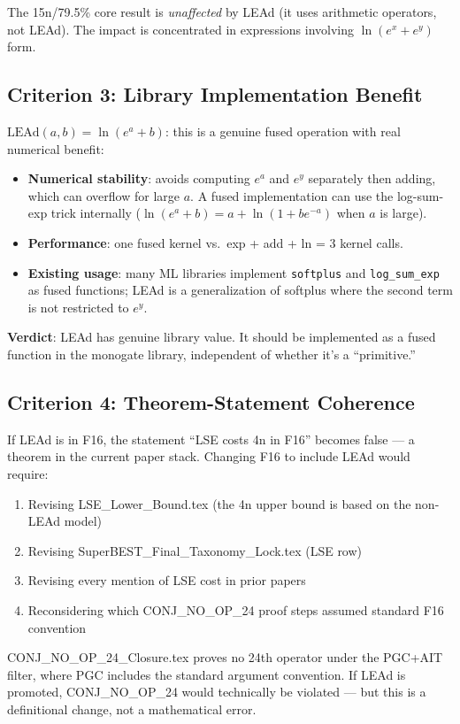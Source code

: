 \documentclass[11pt]{article}
\begin{document}
The 15n/79.5\% core result is \emph{unaffected} by LEAd (it uses arithmetic operators,
not LEAd). The impact is concentrated in expressions involving $\ln(e^x + e^y)$ form.

\subsection{Criterion 3: Library Implementation Benefit}

$\mathrm{LEAd}(a, b) = \ln(e^a + b)$: this is a genuine fused operation with
real numerical benefit:
\begin{itemize}
  \item \textbf{Numerical stability}: avoids computing $e^a$ and $e^y$ separately then adding,
    which can overflow for large $a$. A fused implementation can use the log-sum-exp trick
    internally ($\ln(e^a + b) = a + \ln(1 + b e^{-a})$ when $a$ is large).
  \item \textbf{Performance}: one fused kernel vs.\ exp + add + ln = 3 kernel calls.
  \item \textbf{Existing usage}: many ML libraries implement \texttt{softplus} and
    \texttt{log\_sum\_exp} as fused functions; LEAd is a generalization of softplus
    where the second term is not restricted to $e^y$.
\end{itemize}

\textbf{Verdict}: LEAd has genuine library value. It should be implemented as a
fused function in the monogate library, independent of whether it's a ``primitive.''

\subsection{Criterion 4: Theorem-Statement Coherence}

If LEAd is in F16, the statement ``LSE costs 4n in F16'' becomes false —
a theorem in the current paper stack. Changing F16 to include LEAd would require:
\begin{enumerate}
  \item Revising LSE\_Lower\_Bound.tex (the 4n upper bound is based on the non-LEAd model)
  \item Revising SuperBEST\_Final\_Taxonomy\_Lock.tex (LSE row)
  \item Revising every mention of LSE cost in prior papers
  \item Reconsidering which CONJ\_NO\_OP\_24 proof steps assumed standard F16 convention
\end{enumerate}
CONJ\_NO\_OP\_24\_Closure.tex proves no 24th operator under the PGC+AIT filter,
where PGC includes the standard argument convention. If LEAd is promoted, CONJ\_NO\_OP\_24
would technically be violated — but this is a definitional change, not a mathematical error.
\end{document}
